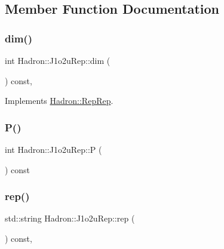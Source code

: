 \subsection{Member Function Documentation}
\mbox{\label{structHadron_1_1J1o2uRep_af458dec9c63e12a6d09f6a389bf8ad15}} 
\subsubsection{\texorpdfstring{dim()}{dim()}}
{\footnotesize\ttfamily int Hadron\+::\+J1o2u\+Rep\+::dim (\begin{DoxyParamCaption}{ }\end{DoxyParamCaption}) const\hspace{0.3cm}{\ttfamily [inline]}, {\ttfamily [virtual]}}



Implements \mbox{\hyperlink{structHadron_1_1RepRep_a92c8802e5ed7afd7da43ccfd5b7cd92b}{Hadron\+::\+Rep\+Rep}}.

\mbox{\label{structHadron_1_1J1o2uRep_a2babc8719f93a2e2b7fa74c30f3d1b67}} 
\subsubsection{\texorpdfstring{P()}{P()}}
{\footnotesize\ttfamily int Hadron\+::\+J1o2u\+Rep\+::P (\begin{DoxyParamCaption}{ }\end{DoxyParamCaption}) const\hspace{0.3cm}{\ttfamily [inline]}}

\mbox{\label{structHadron_1_1J1o2uRep_af553ca15778c740b311c7305ade44c66}} 
\subsubsection{\texorpdfstring{rep()}{rep()}}
{\footnotesize\ttfamily std\+::string Hadron\+::\+J1o2u\+Rep\+::rep (\begin{DoxyParamCaption}{ }\end{DoxyParamCaption}) const\hspace{0.3cm}{\ttfamily [inline]}, {\ttfamily [virtual]}}



